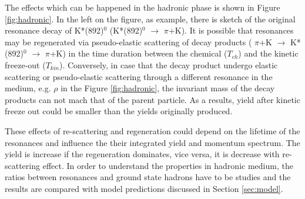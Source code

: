 The effects which can be happened in the hadronic phase is shown in Figure \ref{fig:hadronic}. In the left on the figure, as example, there is sketch of the original resonance decay of K*(892)$^{0}$ (K*(892)$^{0}$ $\rightarrow$ $\pi$+K). It is possible that resonances may be regenerated via pseudo-elastic scattering of decay products ( $\pi$+K $\rightarrow $ K*(892)$^{0}$ $\rightarrow$ $\pi$+K) in the time duration between the chemical ($T_{ch}$) and the kinetic freeze-out ($T_{kin}$).
Conversely, in case that the decay product undergo elastic scattering or pseudo-elastic scattering through a different resonance in the medium, e.g. $\rho$ in the Figure \ref{fig:hadronic}, the invariant mass of the decay products can not mach that of the parent particle. As a results, yield after kinetic freeze out could be smaller than the yields originally produced.

These effects of re-scattering and regeneration could depend on the lifetime of the resonances and influence the their integrated yield and momentum spectrum. The yield is increase if the regeneration dominates, vice versa, it is decrease with re-scattering effect. In order to understand the properties in hadronic medium, the ratios between resonances and ground state hadrons have to be studies and the results are compared with model predictions discussed in Section \ref{sec:model}.




\newpage